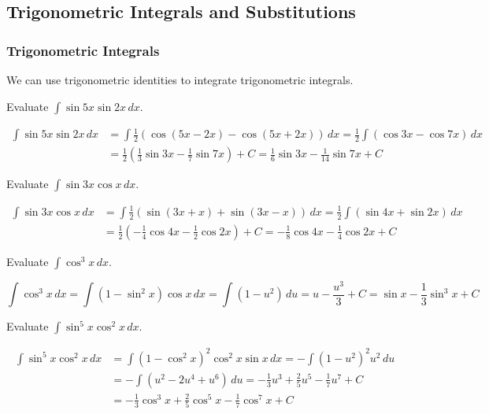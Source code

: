 \subsection{Trigonometric Integrals and Substitutions}

\subsubsection*{Trigonometric Integrals}
We can use trigonometric identities to integrate trigonometric integrals.
\begin{problem}
    Evaluate \(\displaystyle{\int\sin 5x\sin 2x\,dx}\).
\end{problem}
\begin{solution}
    \begin{align*}
        \int\sin 5x\sin 2x\,dx &= \int\frac{1}{2}(\cos(5x-2x)-\cos(5x+2x))\,dx
        =\frac{1}{2}\int(\cos 3x-\cos 7x)\,dx \\
        &= \frac{1}{2}\left(\frac{1}{3}\sin 3x-\frac{1}{7}\sin 7x\right)+C
        =\frac{1}{6}\sin 3x-\frac{1}{14}\sin 7x+C
    \end{align*}
\end{solution}
\begin{problem}
    Evaluate \(\displaystyle{\int\sin 3x\cos x\,dx}\).
\end{problem}
\begin{solution}
    \begin{align*}
        \int\sin 3x\cos x\,dx &= \int\frac{1}{2}(\sin(3x+x)+\sin(3x-x))\,dx
        =\frac{1}{2}\int(\sin 4x+\sin 2x)\,dx \\
        &= \frac{1}{2}\left(-\frac{1}{4}\cos 4x-\frac{1}{2}\cos 2x\right)+C
        =-\frac{1}{8}\cos 4x-\frac{1}{4}\cos 2x+C
    \end{align*}
\end{solution}
\begin{problem}
    Evaluate \(\displaystyle{\int\cos^3 x\,dx}\).
\end{problem}
\begin{solution}
    \[\int\cos^3 x\,dx=\int(1-\sin^2 x)\cos x\,dx=\int(1-u^2)\,du
    =u-\frac{u^3}{3}+C=\sin x-\frac{1}{3}\sin^3 x+C\]
\end{solution}
\begin{problem}
    Evaluate \(\displaystyle{\int\sin^5 x\cos^2 x\,dx}\).
\end{problem}
\begin{solution}
    \begin{align*}
        \int\sin^5 x\cos^2 x\,dx &= \int(1-\cos^2 x)^2\cos^2 x\sin x\,dx
        =-\int(1-u^2)^2u^2\,du \\
        &= -\int(u^2-2u^4+u^6)\,du
        =-\frac{1}{3}u^3+\frac{2}{5}u^5-\frac{1}{7}u^7+C \\
        &= -\frac{1}{3}\cos^3 x+\frac{2}{5}\cos^5 x-\frac{1}{7}\cos^7 x
        +C
    \end{align*}
\end{solution}
